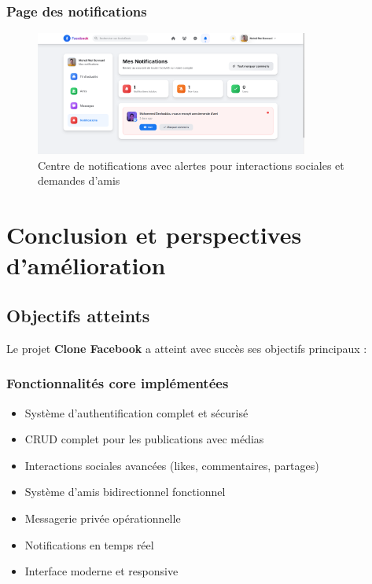 \documentclass[12pt,a4paper]{article}
\begin{document}
\subsubsection{Page des notifications}
\begin{figure}[H]
    \centering
    \includegraphics[width=0.8\textwidth]{screenshots/notifications.png}
    \caption{Centre de notifications avec alertes pour interactions sociales et demandes d'amis}
    \label{fig:notifications}
\end{figure}

\section{Conclusion et perspectives d'am\'elioration}

\subsection{Objectifs atteints}

Le projet \textbf{Clone Facebook} a atteint avec succ\`es ses objectifs principaux :

\subsubsection{Fonctionnalit\'es core impl\'ement\'ees}
\begin{itemize}
    \item Syst\`eme d'authentification complet et s\'ecuris\'e
    \item CRUD complet pour les publications avec m\'edias
    \item Interactions sociales avanc\'ees (likes, commentaires, partages)
    \item Syst\`eme d'amis bidirectionnel fonctionnel
    \item Messagerie priv\'ee op\'erationnelle
    \item Notifications en temps r\'eel
    \item Interface moderne et responsive
\end{itemize}
\end{document}
